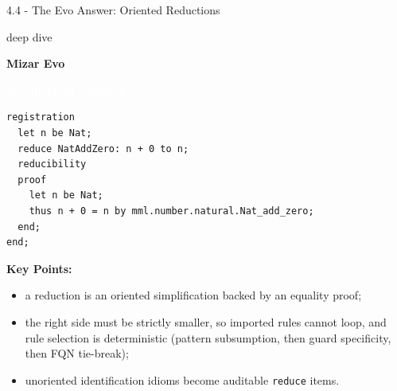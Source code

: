 \documentclass[aspectratio=169,11pt]{beamer}
\newcommand{\statusbadge}[2]{\colorbox{#1}{\textcolor{white}{\strut\scriptsize\sffamily\bfseries #2}}}
\newcommand{\badgeSpec}{\statusbadge{green!35!black}{specification example}}
\newcommand{\deepdivetag}{\hfill\colorbox{black!15}{\textcolor{black!65}{\strut\scriptsize\sffamily deep dive}}}
\begin{document}
\begin{frame}[fragile,t]{4.4 - The Evo Answer: Oriented Reductions\deepdivetag}
\smallskip
\textbf{Mizar Evo}~\badgeSpec
\begin{lstlisting}[language={mizar},basicstyle=\ttfamily\footnotesize]
registration
  let n be Nat;
  reduce NatAddZero: n + 0 to n;
  reducibility
  proof
    let n be Nat;
    thus n + 0 = n by mml.number.natural.Nat_add_zero;
  end;
end;
\end{lstlisting}
\smallskip
\textbf{Key Points:}
\begin{itemize}
\setlength{\itemsep}{1pt}
\setlength{\parsep}{0pt}
\setlength{\parskip}{0pt}
\item a reduction is an oriented simplification backed by an equality proof;
\item the right side must be strictly smaller, so imported rules cannot loop, and rule selection is deterministic (pattern subsumption, then guard specificity, then FQN tie-break);
\item unoriented identification idioms become auditable \texttt{reduce} items.
\end{itemize}
\end{frame}
\end{document}

